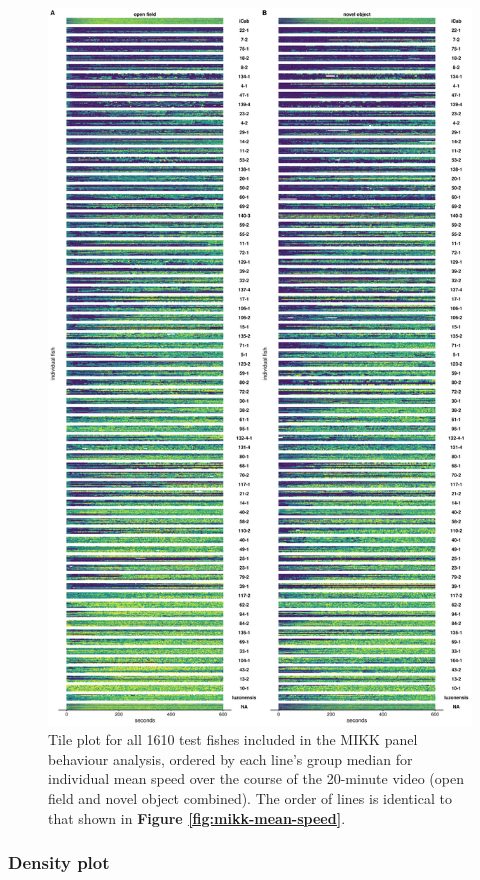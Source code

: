 \documentclass[
]{book}
\begin{document}
\begin{figure}
\includegraphics[width=1\linewidth]{figs/mikk_behaviour/0.08_15_tile_dge} \caption{Tile plot for all 1610 test fishes included in the MIKK panel behaviour analysis, ordered by each line's group median for individual mean speed over the course of the 20-minute video (open field and novel object combined). The order of lines is identical to that shown in \textbf{Figure \ref{fig:mikk-mean-speed}}.}\label{fig:mikk-all-tile-dge}
\end{figure}

\hypertarget{density-plot}{%
\subsubsection{Density plot}\label{density-plot}}
\end{document}
